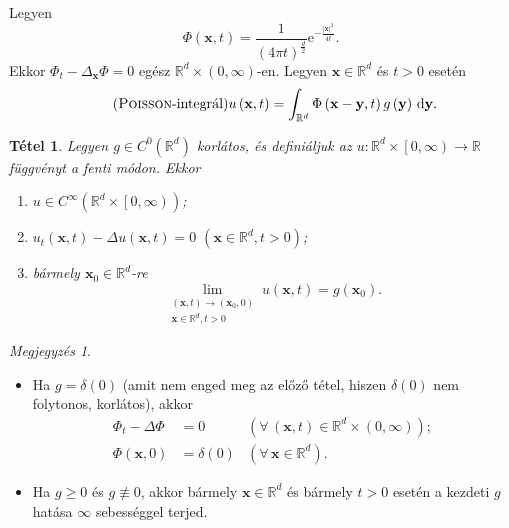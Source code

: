 \documentclass[%
	DIV=15,appendixprefix]{scrreprt}
\newtheorem*{tetel}{Tétel}
\theoremstyle{definition}
\theoremstyle{remark}
\newtheorem*{megj}{Megjegyzés}
\begin{document}
Legyen
\begin{equation}\tag{fundamentális megoldás}
	\Phi \left( \mathbf{ x },{} t \right) = \frac{ 1 }{ \left( 4 \pi t \right)^{ \frac{ d }{ 2 } } }
	\mathrm{ e }^{ - \frac{ \left| \mathbf{ x } \right|^{ 2 } }{ 4 t } }.
\end{equation}
Ekkor $ \Phi_{ t } - \Delta_{ \mathbf{ x } } \Phi = 0 $ egész $ \mathbb{ R }^{ d } \times \left(
0,{} \infty \right) $-en. Legyen $ \mathbf{ x } \in \mathbb{ R }^{ d } $ és $ t > 0 $ esetén
\begin{equation}\tag{\textsc{Poisson}-integrál}
	u \left( \mathbf{ x },{} t \right) = \int_{ \mathbb{ R }^{ d } } \Phi \left( \mathbf{ x } -
	\mathbf{ y },{} t \right) g \left( \mathbf{ y } \right) \, \mathrm{ d } \mathbf{ y }.
\end{equation}
\begin{tetel}
	Legyen $ g \in C^{ 0 } \left( \mathbb{ R }^{ d } \right) $ korlátos, és definiáljuk az $ u
	\colon \mathbb{ R }^{ d } \times \left.\left[ 0,{} \infty \right)\right. \rightarrow
	\mathbb{ R } $ függvényt a fenti módon. Ekkor
	\begin{enumerate}
		\item $ u \in C^{ \infty } \left( \mathbb{ R }^{ d } \times \left.\left[ 0,{} \infty
		\right)\right. \right)$;
		\item $ u_{ t } \left( \mathbf{ x },{} t \right) - \Delta u \left( \mathbf{ x },{} t \right)
		= 0 $ $ \left( \mathbf{ x } \in \mathbb{ R }^{ d },{} t > 0 \right) $;
		\item bármely $ \mathbf{ x }_{ 0 } \in \mathbb{ R }^{ d } $-re
		\begin{equation*}
			\lim_{ \substack{ \left( \mathbf{ x },{} t \right) \rightarrow \left(
			\mathbf{ x }_{ 0 },{} 0 \right)\\\mathbf{ x } \in \mathbb{ R }^{ d },{} t > 0 } } u
			\left( \mathbf{ x },{} t \right) = g \left( \mathbf{ x }_{ 0 } \right).
		\end{equation*}
	\end{enumerate}
\end{tetel}
\begin{megj}\leavevmode
	\begin{itemize}
		\item Ha $ g = \delta \left( 0 \right) $ (amit nem enged meg az előző tétel, hiszen $ \delta
			\left( 0 \right) $ nem folytonos, korlátos), akkor
			\begin{align*}
				\Phi_{ t } - \Delta \Phi &= 0 & \left( \forall \, \left( \mathbf{ x },{} t \right)
					\in \mathbb{ R }^{ d } \times \left( 0,{} \infty \right) \right);\\
				\Phi \left( \mathbf{ x },{} 0 \right) &= \delta \left( 0 \right) & \left( \forall \,
					\mathbf{ x } \in \mathbb{ R }^{ d } \right).
			\end{align*}
		\item Ha $ g \ge 0 $ és $ g \not \equiv 0 $, akkor bármely $ \mathbf{ x } \in
			\mathbb{ R }^{ d } $ és bármely $ t > 0 $ esetén a kezdeti $ g $ hatása $ \infty $
			sebességgel terjed.
	\end{itemize}
\end{megj}
\end{document}
